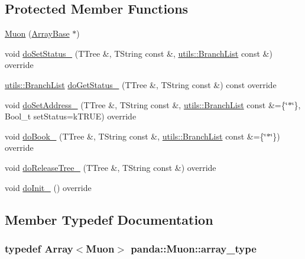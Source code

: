 \subsection*{Protected Member Functions}
\begin{DoxyCompactItemize}
\item 
\hyperlink{classpanda_1_1Muon_a704600bf4a1fa7c7208730cd339d1680}{Muon} (\hyperlink{classpanda_1_1ArrayBase}{ArrayBase} $\ast$)
\item 
void \hyperlink{classpanda_1_1Muon_a5a1c65b72491bc9df325bc182568e40c}{doSetStatus\_\-} (TTree \&, TString const \&, \hyperlink{classpanda_1_1utils_1_1BranchList}{utils::BranchList} const \&) override
\item 
\hyperlink{classpanda_1_1utils_1_1BranchList}{utils::BranchList} \hyperlink{classpanda_1_1Muon_af2331a81be13a07cc0202a6d107b0685}{doGetStatus\_\-} (TTree \&, TString const \&) const override
\item 
void \hyperlink{classpanda_1_1Muon_a7488d95aaa9e9a79bda6d90b8967a52b}{doSetAddress\_\-} (TTree \&, TString const \&, \hyperlink{classpanda_1_1utils_1_1BranchList}{utils::BranchList} const \&=\{\char`\"{}$\ast$\char`\"{}\}, Bool\_\-t setStatus=kTRUE) override
\item 
void \hyperlink{classpanda_1_1Muon_af27e42e8f6276dcbcf61ac742b17a4cd}{doBook\_\-} (TTree \&, TString const \&, \hyperlink{classpanda_1_1utils_1_1BranchList}{utils::BranchList} const \&=\{\char`\"{}$\ast$\char`\"{}\}) override
\item 
void \hyperlink{classpanda_1_1Muon_ab6aedf6cd1f1714f4cd3b315cee18c8d}{doReleaseTree\_\-} (TTree \&, TString const \&) override
\item 
void \hyperlink{classpanda_1_1Muon_a50a228225667669a6fa827d426740e70}{doInit\_\-} () override
\end{DoxyCompactItemize}


\subsection{Member Typedef Documentation}
\hypertarget{classpanda_1_1Muon_a03903de481ebc3c6db1d7d979ba99691}{
\subsubsection[{array\_\-type}]{\setlength{\rightskip}{0pt plus 5cm}typedef {\bf Array}$<${\bf Muon}$>$ {\bf panda::Muon::array\_\-type}}}
\label{classpanda_1_1Muon_a03903de481ebc3c6db1d7d979ba99691}


